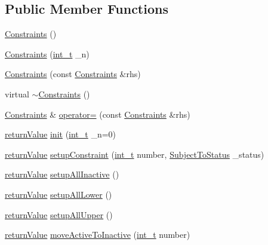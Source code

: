 \subsection*{Public Member Functions}
\begin{DoxyCompactItemize}
\item 
\hyperlink{class_constraints_a9c677de63278cf243c9a9d9afcfd0877}{Constraints} ()
\item 
\hyperlink{class_constraints_ae89609d265bd2b331b23f44ee8de4ce7}{Constraints} (\hyperlink{_types_8hpp_ab6fd6105e64ed14a0c9281326f05e623}{int\+\_\+t} \+\_\+n)
\item 
\hyperlink{class_constraints_aeb433ff1018134588275911c6acf0f8e}{Constraints} (const \hyperlink{class_constraints}{Constraints} \&rhs)
\item 
virtual \hyperlink{class_constraints_a61f155a69191e07c32a4a1e9e60067e9}{$\sim$\+Constraints} ()
\item 
\hyperlink{class_constraints}{Constraints} \& \hyperlink{class_constraints_add013b3e2480cf830eef39123e7afd6e}{operator=} (const \hyperlink{class_constraints}{Constraints} \&rhs)
\item 
\hyperlink{_message_handling_8hpp_a81d556f613bfbabd0b1f9488c0fa865e}{return\+Value} \hyperlink{class_constraints_abb4139ecad1739efe85bcb03b22f282d}{init} (\hyperlink{_types_8hpp_ab6fd6105e64ed14a0c9281326f05e623}{int\+\_\+t} \+\_\+n=0)
\item 
\hyperlink{_message_handling_8hpp_a81d556f613bfbabd0b1f9488c0fa865e}{return\+Value} \hyperlink{class_constraints_ad0d79440b823d59f69459823bee03f7c}{setup\+Constraint} (\hyperlink{_types_8hpp_ab6fd6105e64ed14a0c9281326f05e623}{int\+\_\+t} number, \hyperlink{_types_8hpp_a70a6a40d261a015ead8d43aa589383a4}{Subject\+To\+Status} \+\_\+status)
\item 
\hyperlink{_message_handling_8hpp_a81d556f613bfbabd0b1f9488c0fa865e}{return\+Value} \hyperlink{class_constraints_ac49c5bae8433f8c6623e55088f33d226}{setup\+All\+Inactive} ()
\item 
\hyperlink{_message_handling_8hpp_a81d556f613bfbabd0b1f9488c0fa865e}{return\+Value} \hyperlink{class_constraints_a0bc777ba851991829a569edcc444d004}{setup\+All\+Lower} ()
\item 
\hyperlink{_message_handling_8hpp_a81d556f613bfbabd0b1f9488c0fa865e}{return\+Value} \hyperlink{class_constraints_a883220c48c6ae8d5ff0ef056547f288b}{setup\+All\+Upper} ()
\item 
\hyperlink{_message_handling_8hpp_a81d556f613bfbabd0b1f9488c0fa865e}{return\+Value} \hyperlink{class_constraints_a8f3aa6b120aa8e3e2f18a905b4ef84d5}{move\+Active\+To\+Inactive} (\hyperlink{_types_8hpp_ab6fd6105e64ed14a0c9281326f05e623}{int\+\_\+t} number)

\end{DoxyCompactItemize}
